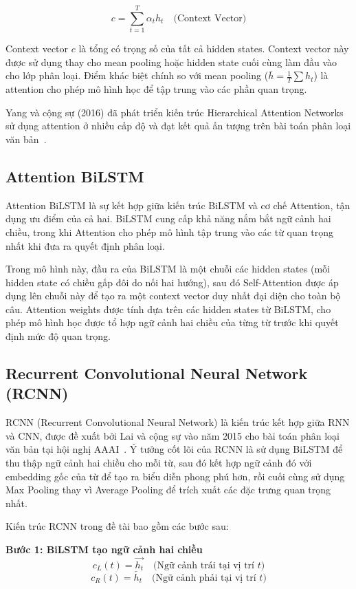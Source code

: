 \documentclass[../BTL.tex]{subfiles}
\begin{document}
\begin{equation}
    c = \sum_{t=1}^{T} \alpha_t h_t \quad \text{(Context Vector)}
\end{equation}

Context vector $c$ là tổng có trọng số của tất cả hidden states. Context vector này được sử dụng thay cho mean pooling hoặc hidden state cuối cùng làm đầu vào cho lớp phân loại. Điểm khác biệt chính so với mean pooling ($\bar{h} = \frac{1}{T} \sum h_t$) là attention cho phép mô hình học để tập trung vào các phần quan trọng.

Yang và cộng sự (2016) đã phát triển kiến trúc Hierarchical Attention Networks sử dụng attention ở nhiều cấp độ và đạt kết quả ấn tượng trên bài toán phân loại văn bản~\cite{yang2016hierarchical}.

\subsection{Attention BiLSTM}
Attention BiLSTM là sự kết hợp giữa kiến trúc BiLSTM và cơ chế Attention, tận dụng ưu điểm của cả hai. BiLSTM cung cấp khả năng nắm bắt ngữ cảnh hai chiều, trong khi Attention cho phép mô hình tập trung vào các từ quan trọng nhất khi đưa ra quyết định phân loại.

Trong mô hình này, đầu ra của BiLSTM là một chuỗi các hidden states (mỗi hidden state có chiều gấp đôi do nối hai hướng), sau đó Self-Attention được áp dụng lên chuỗi này để tạo ra một context vector duy nhất đại diện cho toàn bộ câu. Attention weights được tính dựa trên các hidden states từ BiLSTM, cho phép mô hình học được tổ hợp ngữ cảnh hai chiều của từng từ trước khi quyết định mức độ quan trọng.

\subsection{Recurrent Convolutional Neural Network (RCNN)}
RCNN (Recurrent Convolutional Neural Network) là kiến trúc kết hợp giữa RNN và CNN, được đề xuất bởi Lai và cộng sự vào năm 2015 cho bài toán phân loại văn bản tại hội nghị AAAI~\cite{lai2015rcnn}. Ý tưởng cốt lõi của RCNN là sử dụng BiLSTM để thu thập ngữ cảnh hai chiều cho mỗi từ, sau đó kết hợp ngữ cảnh đó với embedding gốc của từ để tạo ra biểu diễn phong phú hơn, rồi cuối cùng sử dụng Max Pooling thay vì Average Pooling để trích xuất các đặc trưng quan trọng nhất.

Kiến trúc RCNN trong đề tài bao gồm các bước sau:

\textbf{Bước 1: BiLSTM tạo ngữ cảnh hai chiều}
\begin{equation}
    c_L(t) = \overrightarrow{h_t} \quad \text{(Ngữ cảnh trái tại vị trí } t\text{)}
\end{equation}
\begin{equation}
    c_R(t) = \overleftarrow{h_t} \quad \text{(Ngữ cảnh phải tại vị trí } t\text{)}
\end{equation}
\end{document}

